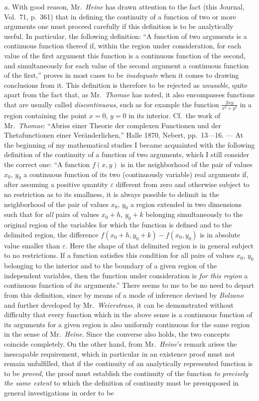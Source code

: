 \documentclass{article}
\begin{document}
\emph{a.} With good reason, Mr.~\emph{Heine} has drawn attention to the fact (this Journal, Vol.~71, p.~361) that in defining the continuity of a function of two or more arguments one must proceed carefully if this definition is to be analytically useful. In particular, the following definition: ``A function of two arguments is a continuous function thereof if, within the region under consideration, for each value of the first argument this function is a continuous function of the second, and simultaneously for each value of the second argument a continuous function of the first,'' proves in most cases to be \emph{inadequate} when it comes to drawing conclusions from it. This definition is therefore to be rejected as \emph{unusable}, quite apart from the fact that, as Mr.~\emph{Thomae} has noted, it also encompasses functions that are usually called \emph{discontinuous}, such as for example the function $\frac{2xy}{x^2+y^2}$ in a region containing the point $x=0$, $y=0$ in its interior. Cf.~the work of Mr.~\emph{Thomae}: ``Abriss einer Theorie der complexen Functionen und der Thetafunctionen einer Veränderlichen,'' Halle 1870, Nebert, pp.~13---16. --- At the beginning of my mathematical studies I became acquainted with the following definition of the continuity of a function of two arguments, which I still consider the correct one: ``A function $f(x, y)$ is in the neighborhood of the pair of values $x_0$, $y_0$ a continuous function of its two (continuously variable) real arguments if, after assuming a positive quantity $\varepsilon$ different from zero and otherwise subject to no restriction as to its smallness, it is always possible to delimit in the neighborhood of the pair of values $x_0$, $y_0$ a region extended in two dimensions such that for \emph{all} pairs of values $x_0 + h$, $y_0 + k$ belonging simultaneously to the original region of the variables for which the function is defined and to the delimited region, the difference $f(x_0 + h, y_0 + k) - f(x_0, y_0)$ is in absolute value smaller than $\varepsilon$. Here the shape of that delimited region is in general subject to no restrictions. If a function satisfies this condition for all pairs of values $x_0$, $y_0$ belonging to the interior and to the boundary of a given region of the independent variables, then the function under consideration is \emph{for this region} a continuous function of its arguments.'' There seems to me to be no need to depart from this definition, since by means of a mode of inference devised by \emph{Bolzano} and further developed by Mr.~\emph{Weierstrass}, it can be demonstrated without difficulty that every function which in the above sense is a continuous function of its arguments for a given region is also uniformly continuous for the same region in the sense of Mr.~\emph{Heine}. Since the converse also holds, the two concepts coincide completely. On the other hand, from Mr.~\emph{Heine}'s remark arises the inescapable requirement, which in particular in an existence proof must not remain unfulfilled, that if the continuity of an analytically represented function is to be \emph{proved}, the proof must establish the continuity of the function \emph{to precisely the same extent} to which the definition of continuity must be presupposed in general investigations in order to be 
\end{document}

